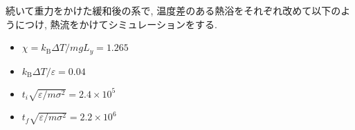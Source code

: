続いて重力をかけた緩和後の系で, 温度差のある熱浴をそれぞれ改めて以下のようにつけ, 熱流をかけてシミュレーションをする. 

\begin{itemize}
  \item $\chi = k_{\text{B}}\Delta T / mg L_y = 1.265$
  \item $k_{\text{B}} \Delta T/\varepsilon = 0.04$
  \item $t_i \sqrt{\varepsilon / m \sigma^2} = 2.4 \times 10^{5}$
  \item $t_f \sqrt{\varepsilon / m \sigma^2} = 2.2 \times 10^{6}$
\end{itemize}

